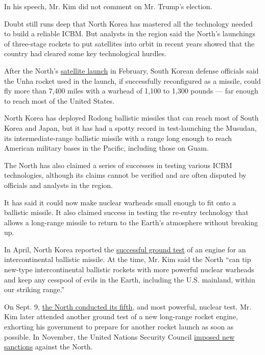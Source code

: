 In his speech, Mr. Kim did not comment on Mr. Trump's election.

Doubt still runs deep that North Korea has mastered all the technology
needed to build a reliable ICBM. But analysts in the region said the
North's launchings of three-stage rockets to put satellites into orbit
in recent years showed that the country had cleared some key
technological hurdles.

After the North's
\href{http://www.nytimes.com/2016/02/07/world/asia/north-korea-moves-up-rocket-launching-plan.html}{satellite
launch} in February, South Korean defense officials said the Unha rocket
used in the launch, if successfully reconfigured as a missile, could fly
more than 7,400 miles with a warhead of 1,100 to 1,300 pounds --- far
enough to reach most of the United States.

North Korea has deployed Rodong ballistic missiles that can reach most
of South Korea and Japan, but it has had a spotty record in
test-launching the Musudan, its intermediate-range ballistic missile
with a range long enough to reach American military bases in the
Pacific, including those on Guam.

The North has also claimed a series of successes in testing various ICBM
technologies, although its claims cannot be verified and are often
disputed by officials and analysts in the region.

It has said it could now make nuclear warheads small enough to fit onto
a ballistic missile. It also claimed success in testing the re-entry
technology that allows a long-range missile to return to the Earth's
atmosphere without breaking up.

In April, North Korea reported the
\href{http://www.nytimes.com/2016/04/10/world/asia/north-korea-says-it-successfully-tested-missile-engine.html}{successful
ground test} of an engine for an intercontinental ballistic missile. At
the time, Mr. Kim said the North ``can tip new-type intercontinental
ballistic rockets with more powerful nuclear warheads and keep any
cesspool of evils in the Earth, including the U.S. mainland, within our
striking range.''

On Sept. 9,
\href{https://www.nytimes.com/2016/09/21/world/asia/north-korea-says-it-has-tested-a-new-long-range-rocket-engine.html}{the
North conducted its fifth}, and most powerful, nuclear test. Mr. Kim
later attended another ground test of a new long-range rocket engine,
exhorting his government to prepare for another rocket launch as soon as
possible. In November, the United Nations Security Council
\href{http://www.nytimes.com/2016/11/30/world/asia/north-korea-un-sanctions.html}{imposed
new sanctions} against the North.

